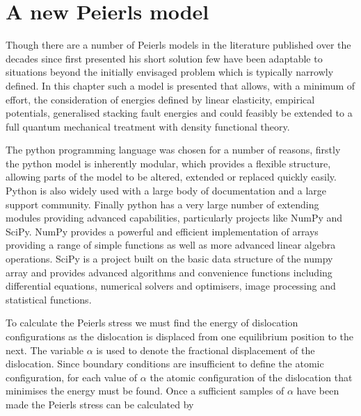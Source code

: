
\chapter{A new Peierls model}
\label{chap:peierls_model}
\graphicspath{{peierls_model/Figs/}}


Though there are a number \cite{Nabarro1947,Huntington1955, puls1976, Vitek1992,  Bulatov1997, Lubarda2007, Clegg2006,Gouriet2015} of Peierls models in the literature published over the decades since \citet{Peierls1940} first presented his short solution few have been adaptable to situations beyond the initially envisaged problem which is typically narrowly defined. In this chapter such a model is presented that allows, with a minimum of effort, the consideration of energies defined by linear elasticity, empirical potentials, generalised stacking fault energies and could feasibly be extended to a full quantum mechanical treatment with density functional theory.

The python programming language was chosen for a number of reasons, firstly the python model is inherently modular, which provides a flexible structure, allowing parts of the model to be altered, extended or replaced quickly easily. Python is also widely used with a large body of documentation and a large support community. Finally python has a very large number of extending modules providing advanced capabilities, particularly projects like NumPy and SciPy. NumPy provides a powerful and efficient implementation of arrays providing a range of simple functions as well as more advanced linear algebra operations. SciPy is a project built on the basic data structure of the numpy array and provides advanced algorithms and convenience functions including differential equations, numerical solvers and optimisers, image processing and statistical functions.


To calculate the Peierls stress we must find the energy of dislocation configurations as the dislocation is displaced from one equilibrium position to the next. The variable $\alpha$ is used to denote the fractional displacement of the dislocation. Since boundary conditions are insufficient to define the atomic configuration, for each value of $\alpha$ the atomic configuration of the dislocation that minimises the energy must be found. Once a sufficient samples of $\alpha$ have been made the Peierls stress can be calculated by 

